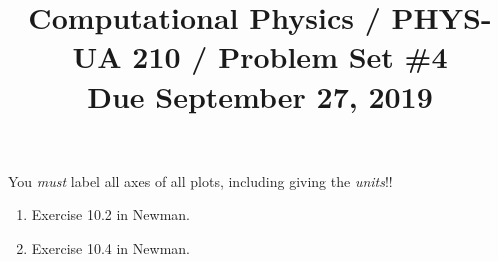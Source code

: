\documentclass[11pt, preprint]{aastex}
\begin{document}
\title{\bf Computational Physics / PHYS-UA 210 / Problem Set \#4
\\ Due September 27, 2019 }

You {\it must} label all axes of all plots, including giving the {\it
  units}!!

\begin{enumerate}
  \item Exercise 10.2 in Newman.
  \item Exercise 10.4 in Newman.

\end{enumerate}
\end{document}
